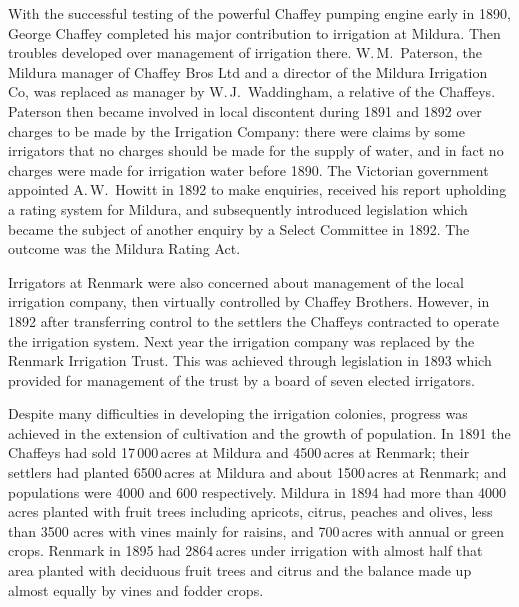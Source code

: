 With the successful testing of the powerful Chaffey pumping engine
early in 1890, George Chaffey completed his major contribution to
irrigation at Mildura.  Then troubles developed over management of
irrigation there.  W.\,M.~Paterson,  the Mildura
manager of Chaffey Bros Ltd and a director of the Mildura Irrigation
Co, was replaced as manager by W.\,J.~Waddingham,  a relative of the Chaffeys.  Paterson then became involved in
local discontent during 1891 and 1892 over charges to be made by the
Irrigation Company: there were claims by some irrigators that no
charges should be made for the supply of water, and in fact no charges
were made for irrigation water before 1890.  The Victorian government
appointed A.\,W.~Howitt  in 1892 to make
enquiries, received his report upholding a rating system for Mildura,
and subsequently introduced legislation which became the subject of
another enquiry by a Select Committee in 1892.  The outcome was the
Mildura Rating Act.

Irrigators at Renmark were also concerned about management of the
local irrigation company, then virtually controlled by Chaffey
Brothers.  However, in 1892 after transferring control to the settlers
the Chaffeys contracted to operate the irrigation system.  Next year
the irrigation company was replaced by the Renmark Irrigation
Trust.  This was achieved through
legislation in 1893 which provided for management of the trust by a
board of seven elected irrigators.

Despite many difficulties in developing the irrigation colonies,
prog\-ress was achieved in the extension of cultivation and the growth
of population.  In 1891 the Chaffeys had sold 17\,000\,acres at
Mildura and 4500\,acres at Renmark; their settlers had planted
6500\,acres at Mildura and about 1500\,acres at Renmark; and
populations were 4000 and 600 respectively.  Mildura in 1894 had more
than 4000\,acres planted with fruit trees including apricots, citrus,
peaches and olives, less than 3500 acres with vines mainly for
raisins, and 700\,acres with annual or green crops.  Renmark in 1895
had 2864\,acres under irrigation with almost half that area planted
with deciduous fruit trees and citrus and the balance made up almost
equally by vines and fodder crops.

